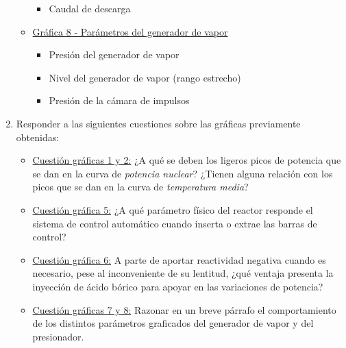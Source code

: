\begin{enumerate}
\begin{itemize}
\begin{itemize}
        \item Caudal de descarga
      \end{itemize}
      \item \underline{Gráfica 8 - Parámetros del generador de vapor}
      \begin{itemize}
        \item Presión del generador de vapor
        \item Nivel del generador de vapor (rango estrecho)
        \item Presión de la cámara de impulsos
      \end{itemize}
    \end{itemize}
  \vspace{1cm}
  \item Responder a las siguientes cuestiones sobre las gráficas previamente obtenidas:
  \begin{itemize}
    \item \underline{Cuestión gráficas 1 y 2:} ¿A qué se deben los ligeros picos de potencia que se dan en la curva de \textit{potencia nuclear}? ¿Tienen alguna relación con los picos que se dan en la curva de \textit{temperatura media}?
    \item \underline{Cuestión gráfica 5:} ¿A qué parámetro físico del reactor responde el sistema de control automático cuando inserta o extrae las barras de control?
    \item \underline{Cuestión gráfica 6:} A parte de aportar reactividad negativa cuando es necesario, pese al inconveniente de su lentitud, ¿qué ventaja presenta la inyección de ácido bórico para apoyar en las variaciones de potencia?
    \item \underline{Cuestión gráficas 7 y 8:} Razonar en un breve párrafo el comportamiento de los distintos parámetros graficados del generador de vapor y del presionador.
  \end{itemize}


\end{enumerate}
